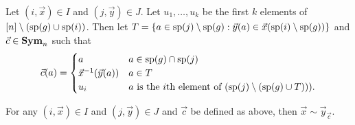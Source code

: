 \documentclass[../paper.tex]{subfiles}
\begin{document}


Let $(i, \vec{x}) \in I$ and $(j, \vec{y}) \in J$. Let $u_1, \ldots , u_k$ be
the first $k$ elements of $[n] \setminus (\text{sp}(g) \cup \text{sp}(i))$. Then let
$T = \{a \in \text{sp}(j) \setminus \text{sp}(g) : \vec{y}(a) \in \vec{x}(\text{sp}(i)
\setminus \text{sp}(g))\}$ and $\vec{c} \in \text{\textbf{Sym}}_n$ such that
\[
  \vec{c} (a) =
  \begin{cases}
    a & a \in \text{sp}(g) \cap \text{sp}(j)\\
    \vec{x}^{-1}(\vec{y}(a)) & a \in T\\
    u_{i} & \text{$a$ is the $i$th element of $(\text{sp}(j) \setminus (\text{sp}(g)
      \cup T)))$}.
  \end{cases}
\]
\begin{lem}
  For any $(i, \vec{x}) \in I$ and $(j, \vec{y}) \in J$ and $\vec{c}$ be defined
  as above, then $\vec{x} \sim \vec{y}_{\vec{c}}$.
\end{lem}
\end{document}
